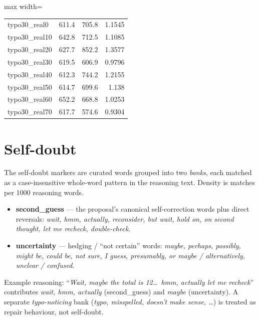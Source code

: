 \documentclass[11pt]{article}
\begin{document}
\begin{table}[H]
\begin{adjustbox}{max width=\textwidth}
\begin{tabular}{lrrr}
typo30\_real0 & 611.4 & 705.8 & 1.1545 \\
typo30\_real10 & 642.8 & 712.5 & 1.1085 \\
typo30\_real20 & 627.7 & 852.2 & 1.3577 \\
typo30\_real30 & 619.5 & 606.9 & 0.9796 \\
typo30\_real40 & 612.3 & 744.2 & 1.2155 \\
typo30\_real50 & 614.7 & 699.6 & 1.138 \\
typo30\_real60 & 652.2 & 668.8 & 1.0253 \\
typo30\_real70 & 617.7 & 574.6 & 0.9304 \\
\bottomrule
\end{tabular}
\end{adjustbox}
\end{table}

\section*{Self-doubt}
\noindent The self-doubt markers are curated words grouped into two
\emph{banks}, each matched as a case-insensitive whole-word pattern in the reasoning
text. Density is matches per 1000 reasoning words.
\begin{itemize}\setlength{\itemsep}{1pt}
  \item \textbf{second\_guess} --- the proposal's canonical self-correction words plus
  direct reversals: \emph{wait, hmm, actually, reconsider, but wait, hold on, on second
  thought, let me recheck, double-check}.
  \item \textbf{uncertainty} --- hedging / ``not certain'' words: \emph{maybe, perhaps,
  possibly, might be, could be, not sure, I guess, presumably, or maybe / alternatively,
  unclear / confused}.
\end{itemize}
\noindent Example reasoning: ``\emph{Wait, maybe the total is 12\dots\ hmm, actually let
me recheck}'' contributes \emph{wait, hmm, actually} (second\_guess) and \emph{maybe}
(uncertainty). A separate \emph{typo-noticing} bank (\emph{typo, misspelled, doesn't make
sense, \dots}) is treated as repair behaviour, not self-doubt.
\medskip
\end{document}
